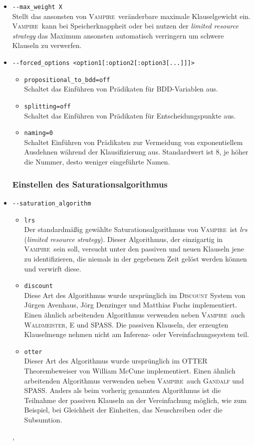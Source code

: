 \documentclass{article}
\newcommand{\vampire}{\textsc{Vampire}~}
\begin{document}
\begin{itemize}
	\item \verb|--max_weight X| \label{arg:maxweight}\\
	Stellt das ansonsten von \vampire veränderbare maximale Klauselgewicht ein. \vampire kann bei Speicherknappheit oder bei nutzen der \emph{limited resource strategy} das Maximum ansonsten automatisch verringern um schwere Klauseln zu verwerfen.
	\item \verb|--forced_options <option1[:option2[:option3[...]]]>| \label{arg:forcedoptions}
	\begin{itemize}
		\item \verb|propositional_to_bdd=off| \\
		Schaltet das Einführen von Prädikaten für BDD-Variablen aus.
		\item \verb|splitting=off| \\
		Schaltet das Einführen von Prädikaten für Entscheidungspunkte aus.
		\item \verb|naming=0| \\
		Schaltet Einführen von Prädikaten zur Vermeidung von exponentiellem Ausdehnen während der Klausifizierung aus.
		Standardwert ist 8, je höher die Nummer, desto weniger eingeführte Namen.\\
	\end{itemize}

	\subsubsection{Einstellen des Saturationsalgorithmus}

\item \verb|--saturation_algorithm| \label{arg:saturationalgorithm}
\begin{itemize}
	\item \verb|lrs|\\
	Der standardmäßig gewählte Saturationsalgorithmus von \vampire ist \emph{lrs} (\emph{limited resource strategy}).
	Dieser Algorithmus, der einzigartig in \vampire sein soll, versucht unter den passiven und neuen Klauseln jene zu identifizieren, die niemals in der gegebenen Zeit gelöst werden können und verwirft diese.
	\item \verb|discount|\\
	Diese Art des Algorithmus wurde ursprünglich im \textsc{Discount} System von Jürgen Avenhaus, Jörg Denzinger und Matthias Fuchs implementiert.
	Einen ähnlich arbeitenden Algorithmus verwenden neben \vampire auch \textsc{Waldmeister}, \textsc{E} und \textsc{SPASS}. 
	Die passiven Klauseln, der erzeugten Klauselmenge nehmen nicht am Inferenz- oder Vereinfachungssystem teil.
	\item \verb|otter|\\
	Dieser Art des Algorithmus wurde ursprünglich im OTTER Theorembeweiser von William McCune implementiert.
	Einen ähnlich arbeitenden Algorithmus verwenden neben \vampire auch \textsc{Gandalf} und \textsc{SPASS}. 
	Anders als beim vorherig genannten Algorithmus ist die Teilnahme der passiven Klauseln an der Vereinfachung möglich, wie zum Beispiel, bei Gleichheit der Einheiten, das Neuschreiben oder die Subsumtion. 
\end{itemize}
\cite{cav2013}, \cite[S. 107]{riazanov2003limited}


\end{itemize}
\end{document}
